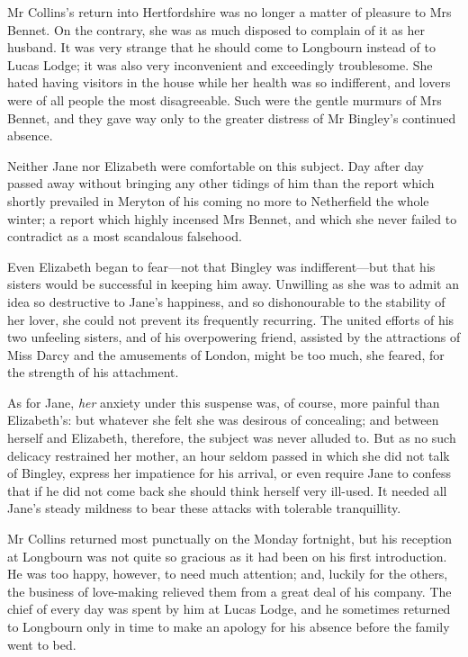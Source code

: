 Mr Collins's return into Hertfordshire was no longer a matter of pleasure to Mrs Bennet. On the contrary, she was as much disposed to complain of it as her husband. It was very strange that he should come to Longbourn instead of to Lucas Lodge; it was also very inconvenient and exceedingly troublesome. She hated having visitors in the house while her health was so indifferent, and lovers were of all people the most disagreeable. Such were the gentle murmurs of Mrs Bennet, and they gave way only to the greater distress of Mr Bingley's continued absence.

Neither Jane nor Elizabeth were comfortable on this subject. Day after day passed away without bringing any other tidings of him than the report which shortly prevailed in Meryton of his coming no more to Netherfield the whole winter; a report which highly incensed Mrs Bennet, and which she never failed to contradict as a most scandalous falsehood.

Even Elizabeth began to fear—not that Bingley was indifferent—but that his sisters would be successful in keeping him away. Unwilling as she was to admit an idea so destructive to Jane's happiness, and so dishonourable to the stability of her lover, she could not prevent its frequently recurring. The united efforts of his two unfeeling sisters, and of his overpowering friend, assisted by the attractions of Miss Darcy and the amusements of London, might be too much, she feared, for the strength of his attachment.

As for Jane, \textit{her} anxiety under this suspense was, of course, more painful than Elizabeth's: but whatever she felt she was desirous of concealing; and between herself and Elizabeth, therefore, the subject was never alluded to. But as no such delicacy restrained her mother, an hour seldom passed in which she did not talk of Bingley, express her impatience for his arrival, or even require Jane to confess that if he did not come back she should think herself very ill-used. It needed all Jane's steady mildness to bear these attacks with tolerable tranquillity.

Mr Collins returned most punctually on the Monday fortnight, but his reception at Longbourn was not quite so gracious as it had been on his first introduction. He was too happy, however, to need much attention; and, luckily for the others, the business of love-making relieved them from a great deal of his company. The chief of every day was spent by him at Lucas Lodge, and he sometimes returned to Longbourn only in time to make an apology for his absence before the family went to bed.

